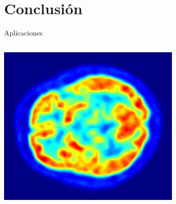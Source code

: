 \documentclass{beamer}
\begin{document}
\section{Conclusión}
\begin{frame}{Aplicaciones}


\begin{columns}
\begin{column}{.3\linewidth}\centering
\includegraphics[width=\linewidth]{pet1.jpg}\par 


\end{column}
\end{columns}
\end{frame}
\end{document}
